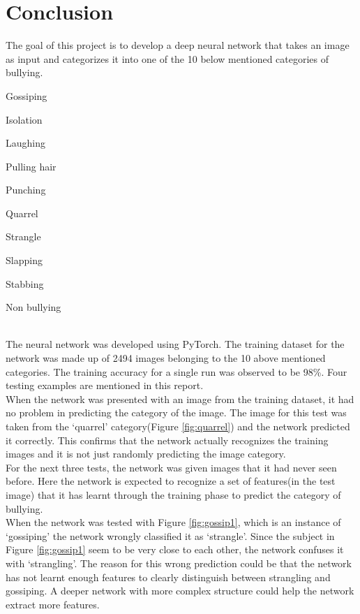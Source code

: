 \documentclass[12pt]{article}
\begin{document}
\section{Conclusion}
The goal of this project is to develop a deep neural network that takes an image as input and categorizes it into one of the 10 below mentioned categories of bullying. \\
\begin {enumerate*} [1) ]%
	\item Gossiping
	\item Isolation
	\item Laughing
	\item Pulling hair
	\item Punching
	\item Quarrel
	\item Strangle
	\item Slapping
	\item Stabbing
	\item Non bullying
\end {enumerate*} \\
The neural network was developed using PyTorch. The training dataset for the network was made up of 2494 images belonging to the 10 above mentioned categories. The training accuracy for a single run was observed to be 98\%. Four testing examples are mentioned in this report. \\

When the network was presented with an image from the training dataset, it had no problem in predicting the category of the image. The image for this test was taken from the \lq{quarrel}\rq{} category(Figure \ref{fig:quarrel}) and the network predicted it correctly. This confirms that the network actually recognizes the training images and it is not just randomly predicting the image category. \\

For the next three tests, the network was given images that it had never seen before. Here the network is expected to recognize a set of features(in the test image) that it has learnt through the training phase to predict the category of bullying. \\

When the network was tested with Figure \ref{fig:gossip1}, which is an instance of \lq{gossiping}\rq{} the network wrongly classified it as \lq{strangle}\rq{}. Since the subject in Figure \ref{fig:gossip1} seem to be very close to each other, the network confuses it with \lq{strangling}\rq{}. The reason for this wrong prediction could be that the network has not learnt enough features to clearly distinguish between strangling and gossiping. A deeper network with more complex structure could help the network extract more features. \\
\end{document}
